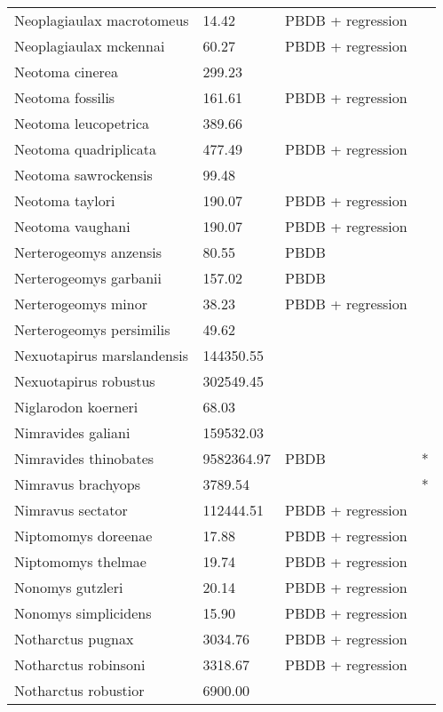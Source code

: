 \documentclass{article}
\begin{document}
\begin{center}
\begin{longtable}{p{} p{} p{} p{}}
    Neoplagiaulax macrotomeus & 14.42 & PBDB + regression &  \\ 
    Neoplagiaulax mckennai & 60.27 & PBDB + regression &  \\ 
    Neotoma cinerea & 299.23 & \cite{Smith2004} &  \\ 
    Neotoma fossilis & 161.61 & PBDB + regression &  \\ 
    Neotoma leucopetrica & 389.66 & \cite{Grohe2010} &  \\ 
    Neotoma quadriplicata & 477.49 & PBDB + regression &  \\ 
    Neotoma sawrockensis & 99.48 & \cite{Tomiya2013} &  \\ 
    Neotoma taylori & 190.07 & PBDB + regression &  \\ 
    Neotoma vaughani & 190.07 & PBDB + regression &  \\ 
    Nerterogeomys anzensis & 80.55 & PBDB &  \\ 
    Nerterogeomys garbanii & 157.02 & PBDB &  \\ 
    Nerterogeomys minor & 38.23 & PBDB + regression &  \\ 
    Nerterogeomys persimilis & 49.62 & \cite{Grohe2010} &  \\ 
    Nexuotapirus marslandensis & 144350.55 & \cite{Tomiya2013} &  \\ 
    Nexuotapirus robustus & 302549.45 & \cite{Tomiya2013} &  \\ 
    Niglarodon koerneri & 68.03 & \cite{Tomiya2013} &  \\ 
    Nimravides galiani & 159532.03 & \cite{Tomiya2013} &  \\ 
    Nimravides thinobates & 9582364.97 & PBDB & * \\ 
    Nimravus brachyops & 3789.54 & \cite{Tomiya2013} & * \\ 
    Nimravus sectator & 112444.51 & PBDB + regression &  \\ 
    Niptomomys doreenae & 17.88 & PBDB + regression &  \\ 
    Niptomomys thelmae & 19.74 & PBDB + regression &  \\ 
    Nonomys gutzleri & 20.14 & PBDB + regression &  \\ 
    Nonomys simplicidens & 15.90 & PBDB + regression &  \\ 
    Notharctus pugnax & 3034.76 & PBDB + regression &  \\ 
    Notharctus robinsoni & 3318.67 & PBDB + regression &  \\ 
    Notharctus robustior & 6900.00 & \cite{Soligo2006} &  \\ 

\end{longtable}
\end{center}
\end{document}
